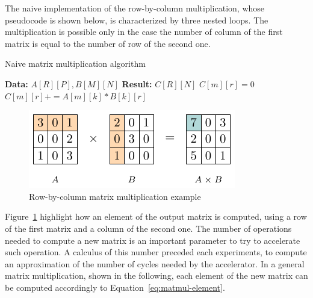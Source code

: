 The naive implementation of the row-by-column multiplication, whose pseudocode is shown below, is characterized by three nested loops.
The multiplication is possible only in the case the number of column of the first matrix is equal to the number of row of the second one.

\begin{algorithm}[H]
    \label{alg:matmul_pseudo}
    \caption{Naive matrix multiplication algorithm}
    \label{alg:var}
    \label{protocol1}
    \begin{algorithmic}[1]
    \STATE \textbf{Data:} $A[R][P], B[M][N]$
    \STATE \textbf{Result:} $C[R][N]$
    \STATE $C[m][r] = 0$
    \STATE $C[m][r] += A[m][k] * B[k][r]$
    \ENDFOR
    \ENDFOR
    \ENDFOR
    \ENDIF
    \end{algorithmic}
\end{algorithm}

\begin{figure}[t]
    \centering
    \includegraphics[height=0.24\textwidth]{Images/row-by-col-mult-example}
    \caption{Row-by-column matrix multiplication example}
    \label{fig:row-by-col-mul-example}
\end{figure}

Figure~\ref{fig:row-by-col-mul-example} highlight how an element of the output matrix is computed, using a row of the first matrix and a column of the second one.
The number of operations needed to compute a new matrix is an important parameter to try to accelerate such operation.
A calculus of this number preceded each experiments, to compute an approximation of the number of cycles needed by the accelerator.
In a general matrix multiplication, shown in the following, each element of the new matrix can be computed accordingly to Equation~\ref{eq:matmul-element}.

